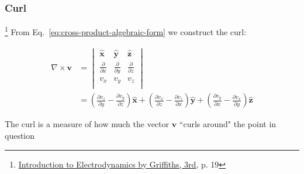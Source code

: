 \subsubsection{Curl}

\footnote{\href{https://trello.com/c/U6HhhDq6}{Introduction to Electrodynamics by Griffiths, 3rd}, p. 19} From
Eq.~\ref{eq:cross-product-algebraic-form} we construct the curl:

\begin{align}
    \nabla \times \boldsymbol{v} &=
    \begin{vmatrix}
        \boldsymbol{\hat{x}}        & \boldsymbol{\hat{y}}        & \boldsymbol{\hat{z}} \\
        \frac{\partial}{\partial x} & \frac{\partial}{\partial y} & \frac{\partial}{\partial z} \\
        v_x                         & v_y                         & v_z \\
    \end{vmatrix} \\ &=
    \left( \frac{\partial v_z}{\partial y} - \frac{\partial v_y}{\partial z} \right)\boldsymbol{\hat{x}} + \left( \frac{\partial v_x}{\partial z} - \frac{\partial v_z}{\partial x} \right)\boldsymbol{\hat{y}} + \left( \frac{\partial v_y}{\partial x} - \frac{\partial v_x}{\partial y} \right)\boldsymbol{\hat{z}}
\end{align}

\begin{tcolorbox}[
    parbox=false,
    colbacktitle=red!10!white,
    colback=blue!10!white,coltitle=red!70!black,
    title=The Geometrical Interpretation of the Divergence
]
    The curl is a measure of how much the vector $\boldsymbol{v}$ ``curls around" the point in question
\end{tcolorbox}

